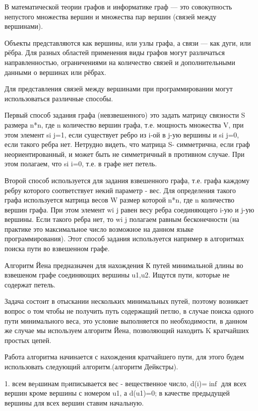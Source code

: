В математической теории графов и информатике граф — это совокупность непустого множества вершин и множества пар вершин (связей между вершинами).

Объекты представляются как вершины, или узлы графа, а связи — как дуги, или рёбра. Для разных областей применения виды графов могут различаться направленностью, ограничениями на количество связей и дополнительными данными о вершинах или рёбрах.

Для представления связей между вершинами при программировании могут использоваться различные способы.

Первый способ задания графа (невзвешенного) это задать матрицу связности S размера n*n, где n количество вершин графа, т.е. мощность множества V, при этом элемент si j=1, если существует ребро из i-ой в j-ую вершины и si j=0, если такого ребра нет. Нетрудно видеть, что матрица S- симметрична, если граф неориентированный, и может быть не симметричный в противном случае. При этом полагаем, что si i=0, т.е. в графе нет петель. 

Второй способ используется для задания взвешенного графа, т.е. графа каждому ребру которого соответствует некий параметр - вес. Для определения такого графа используется матрица весов W размер которой n*n, где n количество вершин графа. При этом элемент wi j равен весу ребра соединяющего i-ую и j-ую вершины. Если такого ребра нет, то wi j полагаем равным бесконечности (на практике это максимальное число возможное на данном языке программирования). Этот способ задания используется например в алгоритмах поиска пути во взвешенном графе. 

Алгоритм Йена предназначен для нахождения К путей минимальной длины во взвешеном графе соединяющих вершины u1,u2. Ищутся пути, которые не содержат петель. 

Задача состоит в отыскании нескольких минимальных путей, поэтому возникает вопрос о том чтобы не получить путь содержащий петлю, в случае поиска одного пути минимального веса, это условие выполняется по необходимости, в данном же случае мы используем алгоритм Йена, позволяющий находить K кратчайших простых цепей. 

Работа алгоритма начинается с нахождения кратчайшего пути, для этого будем использовать следующий алгоритм.(алгоритм Дейкстры). 

1. всем веpшинам пpиписывается вес - вещественное число, d(i)=$\inf$ для всех вершин кроме вершины с номером u1, а d(u1)=0; в качестве предыдущей вершины для всех вершин ставим начальную. 

